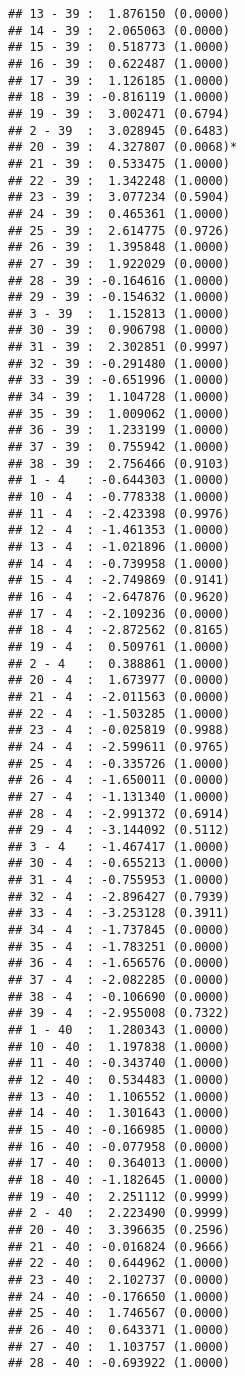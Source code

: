 \documentclass[12pt,]{article}
\begin{document}
\begin{verbatim}
## 13 - 39 :  1.876150 (0.0000)
## 14 - 39 :  2.065063 (0.0000)
## 15 - 39 :  0.518773 (1.0000)
## 16 - 39 :  0.622487 (1.0000)
## 17 - 39 :  1.126185 (1.0000)
## 18 - 39 : -0.816119 (1.0000)
## 19 - 39 :  3.002471 (0.6794)
## 2 - 39  :  3.028945 (0.6483)
## 20 - 39 :  4.327807 (0.0068)*
## 21 - 39 :  0.533475 (1.0000)
## 22 - 39 :  1.342248 (1.0000)
## 23 - 39 :  3.077234 (0.5904)
## 24 - 39 :  0.465361 (1.0000)
## 25 - 39 :  2.614775 (0.9726)
## 26 - 39 :  1.395848 (1.0000)
## 27 - 39 :  1.922029 (0.0000)
## 28 - 39 : -0.164616 (1.0000)
## 29 - 39 : -0.154632 (1.0000)
## 3 - 39  :  1.152813 (1.0000)
## 30 - 39 :  0.906798 (1.0000)
## 31 - 39 :  2.302851 (0.9997)
## 32 - 39 : -0.291480 (1.0000)
## 33 - 39 : -0.651996 (1.0000)
## 34 - 39 :  1.104728 (1.0000)
## 35 - 39 :  1.009062 (1.0000)
## 36 - 39 :  1.233199 (1.0000)
## 37 - 39 :  0.755942 (1.0000)
## 38 - 39 :  2.756466 (0.9103)
## 1 - 4   : -0.644303 (1.0000)
## 10 - 4  : -0.778338 (1.0000)
## 11 - 4  : -2.423398 (0.9976)
## 12 - 4  : -1.461353 (1.0000)
## 13 - 4  : -1.021896 (1.0000)
## 14 - 4  : -0.739958 (1.0000)
## 15 - 4  : -2.749869 (0.9141)
## 16 - 4  : -2.647876 (0.9620)
## 17 - 4  : -2.109236 (0.0000)
## 18 - 4  : -2.872562 (0.8165)
## 19 - 4  :  0.509761 (1.0000)
## 2 - 4   :  0.388861 (1.0000)
## 20 - 4  :  1.673977 (0.0000)
## 21 - 4  : -2.011563 (0.0000)
## 22 - 4  : -1.503285 (1.0000)
## 23 - 4  : -0.025819 (0.9988)
## 24 - 4  : -2.599611 (0.9765)
## 25 - 4  : -0.335726 (1.0000)
## 26 - 4  : -1.650011 (0.0000)
## 27 - 4  : -1.131340 (1.0000)
## 28 - 4  : -2.991372 (0.6914)
## 29 - 4  : -3.144092 (0.5112)
## 3 - 4   : -1.467417 (1.0000)
## 30 - 4  : -0.655213 (1.0000)
## 31 - 4  : -0.755953 (1.0000)
## 32 - 4  : -2.896427 (0.7939)
## 33 - 4  : -3.253128 (0.3911)
## 34 - 4  : -1.737845 (0.0000)
## 35 - 4  : -1.783251 (0.0000)
## 36 - 4  : -1.656576 (0.0000)
## 37 - 4  : -2.082285 (0.0000)
## 38 - 4  : -0.106690 (0.0000)
## 39 - 4  : -2.955008 (0.7322)
## 1 - 40  :  1.280343 (1.0000)
## 10 - 40 :  1.197838 (1.0000)
## 11 - 40 : -0.343740 (1.0000)
## 12 - 40 :  0.534483 (1.0000)
## 13 - 40 :  1.106552 (1.0000)
## 14 - 40 :  1.301643 (1.0000)
## 15 - 40 : -0.166985 (1.0000)
## 16 - 40 : -0.077958 (0.0000)
## 17 - 40 :  0.364013 (1.0000)
## 18 - 40 : -1.182645 (1.0000)
## 19 - 40 :  2.251112 (0.9999)
## 2 - 40  :  2.223490 (0.9999)
## 20 - 40 :  3.396635 (0.2596)
## 21 - 40 : -0.016824 (0.9666)
## 22 - 40 :  0.644962 (1.0000)
## 23 - 40 :  2.102737 (0.0000)
## 24 - 40 : -0.176650 (1.0000)
## 25 - 40 :  1.746567 (0.0000)
## 26 - 40 :  0.643371 (1.0000)
## 27 - 40 :  1.103757 (1.0000)
## 28 - 40 : -0.693922 (1.0000)

\end{verbatim}
\end{document}
